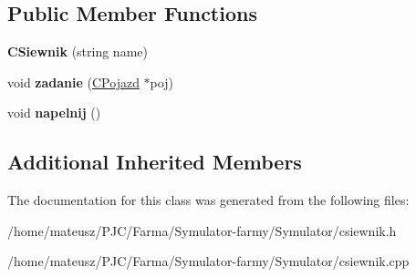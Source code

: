 \subsection*{Public Member Functions}
\begin{DoxyCompactItemize}
\item 
\mbox{\label{class_c_siewnik_a2531d3414ae60785535d8710a77ac58e}} 
{\bfseries C\+Siewnik} (string name)
\item 
\mbox{\label{class_c_siewnik_afd8ab0a7eeae99e6af95cc390e44a956}} 
void {\bfseries zadanie} (\mbox{\hyperlink{class_c_pojazd}{C\+Pojazd}} $\ast$poj)
\item 
\mbox{\label{class_c_siewnik_a2b3d3a0bb09a1b43ac3f9c1e6bb8cbee}} 
void {\bfseries napelnij} ()
\end{DoxyCompactItemize}
\subsection*{Additional Inherited Members}


The documentation for this class was generated from the following files\+:\begin{DoxyCompactItemize}
\item 
/home/mateusz/\+P\+J\+C/\+Farma/\+Symulator-\/farmy/\+Symulator/csiewnik.\+h\item 
/home/mateusz/\+P\+J\+C/\+Farma/\+Symulator-\/farmy/\+Symulator/csiewnik.\+cpp\end{DoxyCompactItemize}
